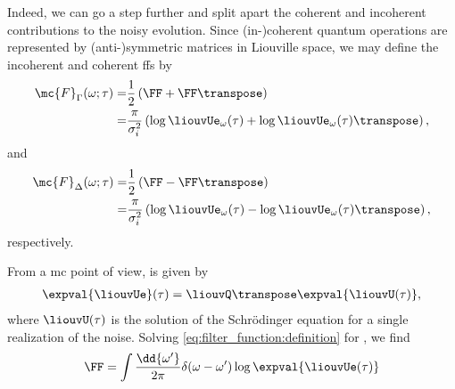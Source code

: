 Indeed, we can go a step further and split apart the coherent and incoherent contributions to the noisy evolution.
Since (in-)coherent quantum operations are represented by (anti-)symmetric matrices in Liouville space, we may define the incoherent and coherent \glspl{ff} by
\begin{equation}
    \label{eq:filter_function:incoherent}
    \begin{split}
        \mc{F}_\Gamma(\omega;\tau) =& \frac{1}{2}\left(\FF + \FF\transpose\right) \\
                                   =& \frac{\pi}{\sigma_i^2}\left(\log\liouvUe_\omega(\tau) + \log\liouvUe_\omega(\tau)\transpose\right),
    \end{split}
\end{equation}
and
\begin{equation}
    \label{eq:filter_function:coherent}
    \begin{split}
        \mc{F}_\Delta(\omega;\tau) =& \frac{1}{2}\left(\FF - \FF\transpose\right) \\
                                   =& \frac{\pi}{\sigma_i^2}\left(\log\liouvUe_\omega(\tau) - \log\liouvUe_\omega(\tau)\transpose\right),
    \end{split}
\end{equation}
respectively.



From a \gls{mc} point of view, \liouvUe is given by
\begin{align}
    \expval{\liouvUe}(\tau) = \liouvQ\transpose \expval{\liouvU(\tau)},
\end{align}
where $\liouvU(\tau)$ is the solution of the Schrödinger equation for a single realization of the noise.
Solving \cref{eq:filter_function:definition} for \FF, we find
\begin{align}
    \FF = \int\frac{\dd{\omega'}}{2\pi} \delta(\omega-\omega') \log\expval{\liouvUe(\tau)}
\end{align}
